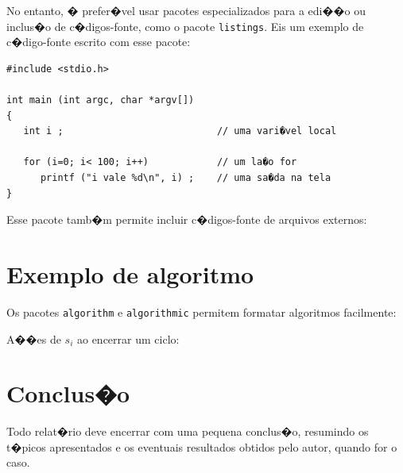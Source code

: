 \documentclass [12pt,oneside] {article}
\begin{document}
No entanto, � prefer�vel usar pacotes especializados para a edi��o ou inclus�o de c�digos-fonte, como o pacote \texttt{listings}. Eis um exemplo de c�digo-fonte escrito com esse pacote:

\begin{lstlisting}
#include <stdio.h>

int main (int argc, char *argv[])
{
   int i ;                           // uma vari�vel local

   for (i=0; i< 100; i++)            // um la�o for
      printf ("i vale %d\n", i) ;    // uma sa�da na tela
}
\end{lstlisting}

Esse pacote tamb�m permite incluir c�digos-fonte de arquivos externos:




\section{Exemplo de algoritmo}

Os pacotes \texttt{algorithm} e \texttt{algorithmic} permitem formatar algoritmos facilmente:

\begin{algorithm}[H]
\caption{A��es de $s_i$ ao encerrar um ciclo:}
\label{on-period-ending}
\begin{small}
\begin{algorithmic}[1]
  \ENDIF
\ENDFOR
\end{algorithmic}
\end{small}
\end{algorithm}
 

\section{Conclus�o}

Todo relat�rio deve encerrar com uma pequena conclus�o, resumindo os t�picos apresentados e os eventuais resultados obtidos pelo autor, quando for o caso.




\end{document}
